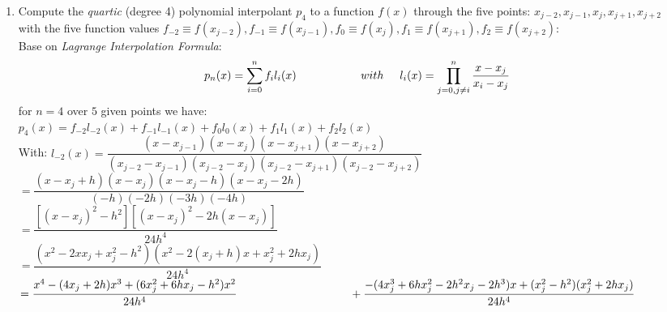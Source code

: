 \documentclass[14pt,a4paper]{article}
\begin{document}
\begin{enumerate}
	\label{1a}
	\item Compute the \textit{quartic} (degree 4) polynomial interpolant $p_4$ to a function $f(x)$ through the five points: $x_{j-2}, x_{j-1}, x_j, x_{j+1}, x_{j+2}$\\
	with the five function values $f_{-2}  \equiv f(x_{j-2}), f_{-1} \equiv f(x_{j-1}), f_0 \equiv f(x_j), f_1 \equiv f(x_{j+1}), f_2 \equiv f(x_{j+2})$: \\
	Base on \textit{Lagrange Interpolation Formula}:
	$$ p_n(x) = \sum_{i=0}^nf_il_i(x) \hspace{2cm} with \hspace{0.5cm} l_i(x) = \prod_{j=0,j \neq i}^{n} \dfrac{x-x_j}{x_i-x_j}$$
	for $n =4$ over $5$ given points we have:\\
	\hspace*{1cm}$p_4(x) = f_{-2}l_{-2}(x) + f_{-1}l_{-1}(x) + f_0l_0(x) + f_1l_1(x) + f_2l_2(x)$\\
	With: \hspace{0.5cm} $l_{-2}(x) = \dfrac{(x-x_{j-1})(x-x_j)(x-x_{j+1})(x-x_{j+2})}{(x_{j-2}-x_{j-1})(x_{j-2}-x_j)(x_{j-2}-x_{j+1})(x_{j-2}-x_{j+2})} $\\
	\hspace*{2.95cm} $= \dfrac{(x-x_j +h)(x-x_j)(x-x_j-h)(x-x_j-2h)}{(-h)(-2h)(-3h)(-4h)}$\\
	\hspace*{2.95cm} $= \dfrac{[(x-x_j)^2 -h^2][(x-x_j)^2 -2h(x-x_j)]}{24h^4} $\\
	\hspace*{2.95cm} $= \dfrac{(x^2 - 2xx_j + x_j^2 -h^2)(x^2 - 2(x_j+h)x +x_j^2 +2hx_j)}{24h^4}$\\
	\hspace*{2.95cm}	$= \dfrac{x^4 - (4x_j+2h)x^3 +(6x_j^2 + 6hx_j -h^2)x^2 }{24h^4} \\
	\hspace*{3.5cm} + \dfrac{- (4x_j^3 +6hx_j^2 -2h^2x_j -2h^3)x + (x_j^2-h^2)(x_j^2+2hx_j)}{24h^4}$\\
	
	

\end{enumerate}
\end{document}
